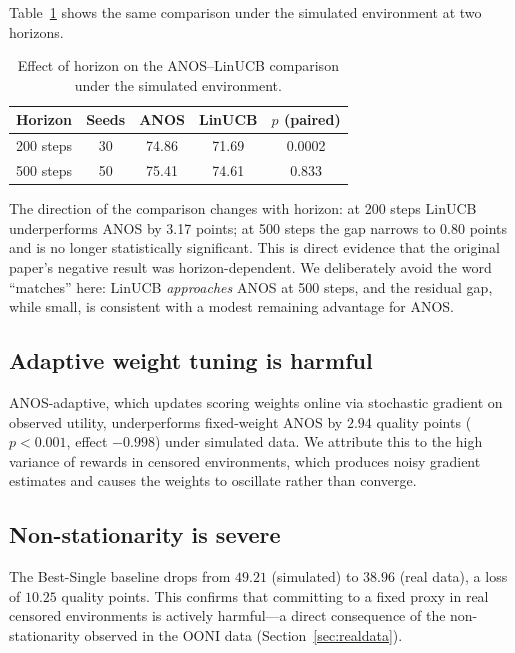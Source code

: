 \documentclass[11pt,a4paper]{article}
\begin{document}
Table~\ref{tab:horizon} shows the same comparison under the
simulated environment at two horizons.

\begin{table}[h]
\centering
\caption{Effect of horizon on the ANOS--LinUCB comparison under the
simulated environment.}
\label{tab:horizon}
\begin{tabular}{lcccc}
\toprule
Horizon & Seeds & ANOS & LinUCB & $p$ (paired) \\
\midrule
200 steps & 30 & 74.86 & 71.69 & 0.0002 \\
500 steps & 50 & 75.41 & 74.61 & 0.833 \\
\bottomrule
\end{tabular}
\end{table}

The direction of the comparison changes with horizon: at 200 steps
LinUCB underperforms ANOS by 3.17 points; at 500 steps the gap
narrows to 0.80 points and is no longer statistically significant.
This is direct evidence that the original paper's negative result
was horizon-dependent. We deliberately avoid the word ``matches''
here: LinUCB \emph{approaches} ANOS at 500 steps, and the residual
gap, while small, is consistent with a modest remaining advantage
for ANOS.

\subsection{Adaptive weight tuning is harmful}

ANOS-adaptive, which updates scoring weights online via stochastic
gradient on observed utility, underperforms fixed-weight ANOS by
$2.94$ quality points ($p<0.001$, effect $-0.998$) under simulated
data. We attribute this to the high variance of rewards in censored
environments, which produces noisy gradient estimates and causes
the weights to oscillate rather than converge.

\subsection{Non-stationarity is severe}

The Best-Single baseline drops from $49.21$ (simulated) to $38.96$
(real data), a loss of $10.25$ quality points. This confirms that
committing to a fixed proxy in real censored environments is
actively harmful---a direct consequence of the non-stationarity
observed in the OONI data (Section~\ref{sec:realdata}).

\end{document}
